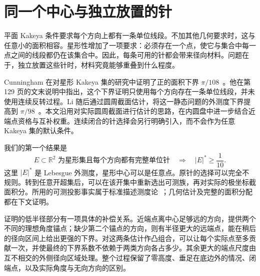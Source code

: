 \begin{abstract}
若平面星形集在每个无向方向上都包含一条闭单位线段，其 Lebesgue 外测度至少为 $1/10$。本文给出完整证明，不要求原集合可测、有界，也不假设能够规则地选择其中的针。证明测量实际的圆周截面，仅在近端点半径允许时使用第二个端点，并在同一份实际面积预算上平衡其余方向。随后，我们研究完整单位针的上界构造及其严格改进，再考察极值问题中若干重构方法的障碍。我们构造了一个固定的有限竞争星体 $K$：对每个同中心且容纳随方向连续、首尾闭合的单位针选择的紧星体 $Q$，都有 $|Q\setminus K|\ge\varepsilon_K>0$，而 $Q$ 的外半径可以任意大。一个规定的双剪切规则，也会在趋近面积下确界的有限输入上严格增加面积。有限采样、半径截断、最长完整弦及强面积闭合，进一步说明这些方法保留了什么信息。锐下确界仍未确定；缺少的比较必须把完整针的可行性与高效构造中的重叠关系结合起来。
\end{abstract}

\section{同一个中心与独立放置的针}\label{sec:introduction}
平面 Kakeya 条件要求每个方向上都有一条单位线段。不加其他几何要求时，这与任意小的面积相容。星形性增加了一项要求：必须存在一个点，使它与集合中每一点之间的线段都仍在该集合中。因此，每条可用的针都会带来径向材料。问题在于，独立放置这些针时，材料究竟能够重叠到什么程度。

Cunningham 在对星形 Kakeya 集的研究中证明了正的面积下界 $\pi/108$~\cite{Cunningham1971}。他在第 129 页的文末说明中指出，这个下界证明只使用每个方向存在一条单位线段，并未使用连续反转过程。Li 随后通过圆周截面估计，将这一静态问题的外测度下界提高到 $\pi/98$~\cite[定理~1.1]{Li2026}。本文沿用对实际圆周截面进行估计的思路，在内圆盘中进一步结合近端点资格与互补权重。连续闭合的针选择会另行明确引入，而不会作为任意 Kakeya 集的默认条件。

我们的第一个结果是
\[
 E\subset\mathbb R^2\text{ 为星形集且每个方向都有完整单位针}
 \quad\Longrightarrow\quad |E|^*\ge\frac1{10}.
\]
这里 $|E|^*$ 是 Lebesgue 外测度，星形中心可以是任意点。原针的选择可以完全不规则。转到任意开超集后，可以在该开集中重新选出可测族，再对实际的极坐标截面积分。所用的可测投影事实属于标准描述测度论~\cite{Kechris1995}；几何估计及完整的面积分配都在下文证明。

证明的低半径部分有一项具体的补偿关系。近端点离中心足够远的方向，提供两个不同的理想角度锚点；缺少第二个锚点的方向，则有半径更大的远端点，能在稍后的径向区间上给出更强的下界。对这两条估计作凸组合，可以让每个实际点至多贡献一次，并使最终的下界系数不依赖于两类方向各占多少。其余更大的端点尺度由互不相交的外侧径向区域处理。整个过程保留了零高度、垂足在底边外的情况、闭端点，以及实际角度与无向方向的区别。


